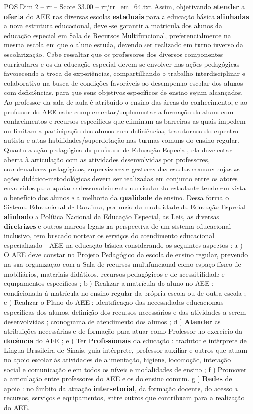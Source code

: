 \begin{textsample}{POS Dim 2 – rr – Score 33.00 – rr/rr\_em\_64.txt}
Assim, objetivando \textbf{atender} a \textbf{oferta} do AEE nas diversas escolas \textbf{estaduais} para a educação básica \textbf{alinhadas} a nova estrutura educacional, deve -se garantir a matricula dos alunos da educação especial em Sala de Recursos Multifuncional, preferencialmente na mesma escola em que o aluno estuda, devendo ser realizado em turno inverso da escolarização.
Cabe ressaltar que os professores dos diversos componentes curriculares e os da educação especial devem se envolver nas ações pedagógicas favorecendo a troca de experiências, compartilhando o trabalho interdisciplinar e colaborativo na busca de condições favoráveis ao desempenho escolar dos alunos com deficiências, para que seus objetivos específicos de ensino sejam alcançados.
Ao professor da sala de aula é atribuído o ensino das áreas do conhecimento, e ao professor do AEE cabe complementar/suplementar a formação do aluno com conhecimentos e recursos específicos que eliminam as barreiras as quais impedem ou limitam a participação dos alunos com deficiências, transtornos do espectro autista e altas habilidades/superdotação nas turmas comuns do ensino regular.
Quanto a ação pedagógica do professor de Educação Especial, ela deve estar aberta à articulação com as atividades desenvolvidas por professores, coordenadores pedagógicos, supervisores e gestores das escolas comuns cujas as ações didático-metodológicas devem ser realizadas em conjunto entre os atores envolvidos para apoiar o desenvolvimento curricular do estudante tendo em vista o benefício dos alunos e a melhoria da \textbf{qualidade} de ensino.
Dessa forma o Sistema Educacional de Roraima, por meio da modalidade da Educação Especial \textbf{alinhado} a Política Nacional da Educação Especial, as Leis, as diversas \textbf{diretrizes} e outros marcos legais na perspectiva de um sistema educacional inclusivo, tem buscado nortear os serviços do atendimento educacional especializado - AEE na educação básica considerando os seguintes aspectos : a ) O AEE deve constar no Projeto Pedagógico da escola de ensino regular, prevendo na sua organização com a Sala de recursos multifuncional como espaço físico de mobiliários, materiais didáticos, recursos pedagógicos e de acessibilidade e equipamentos específicos ; b ) Realizar a matrícula do aluno no AEE : condicionada à matrícula no ensino regular da própria escola ou de outra escola ; c ) Realizar o Plano do AEE : identificação das necessidades educacionais específicas dos alunos, definição dos recursos necessários e das atividades a serem desenvolvidas ; cronograma de atendimento dos alunos ; d ) \textbf{Atender} as atribuições necessárias e de formação para atuar como Professor no exercício da \textbf{docência} do AEE ; e ) Ter \textbf{Profissionais} da educação : tradutor e intérprete de Língua Brasileira de Sinais, guia-intérprete, professor auxiliar e outros que atuam no apoio escolar às atividades de alimentação, higiene, locomoção, interação social e comunicação e em todos os níveis e modalidades de ensino ; f ) Promover a articulação entre professores do AEE e os do ensino comum. g ) \textbf{Redes} de apoio : no âmbito da atuação \textbf{intersetorial}, da formação docente, do acesso a recursos, serviços e equipamentos, entre outros que contribuam para a realização do AEE.

\end{textsample}
